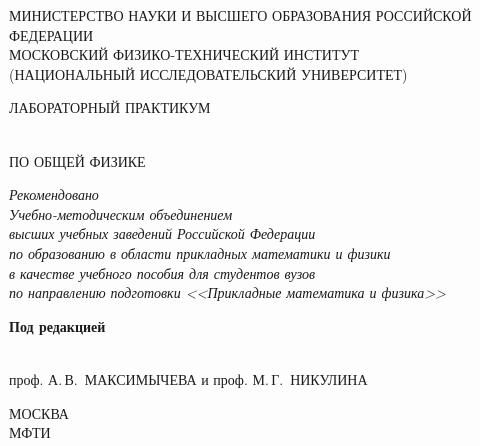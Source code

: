 \setcounter{page}{1}
\thispagestyle{empty}\mbox{}

{\parindent=0pt\centering

{\tiny
МИНИСТЕРСТВО НАУКИ И ВЫСШЕГО ОБРАЗОВАНИЯ РОССИЙСКОЙ ФЕДЕРАЦИИ\\
МОСКОВСКИЙ ФИЗИКО-ТЕХНИЧЕСКИЙ ИНСТИТУТ\\ 
(НАЦИОНАЛЬНЫЙ ИССЛЕДОВАТЕЛЬСКИЙ УНИВЕРСИТЕТ)\par
}

\vskip 20mm

{\bfseries\LARGE\strut ЛАБОРАТОРНЫЙ ПРАКТИКУМ\strut\\ ПО ОБЩЕЙ ФИЗИКЕ\strut}

\vskip 10mm



{\bfseries\Large \MakeUppercase{\nazvan}}

\vskip 20mm

{\it\small Рекомендовано\\ Учебно-методическим объединением\\
высших учебных заведений Российской Федерации\\
по образованию в области прикладных математики и физики\\
в качестве учебного пособия для студентов вузов\\
по направлению подготовки <<Прикладные математика и физика>> }

\vskip 20mm

{\bfseries Под редакцией\strut\\
проф. А.\,В.~МАКСИМЫЧЕВА и проф. М.\,Г.~НИКУЛИНА\strut}

\vfill



{\small МОСКВА\\
МФТИ\\
\god}

}

\newpage
